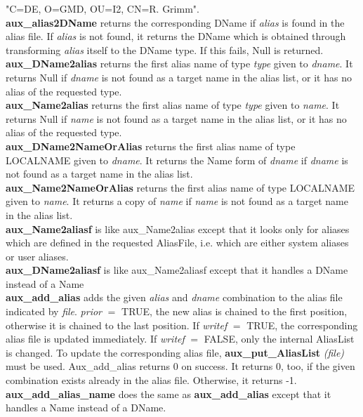 "C=DE, O=GMD, OU=I2, CN=R. Grimm".
\\ [1em]
{\bf aux\_alias2DName} returns the corresponding DName if {\em alias} is found in
the alias file. If {\em alias} is not found, 
it returns the DName which is obtained
through transforming {\em alias} itself to the DName type. If this fails, Null is
returned.
\\ [1em]
{\bf aux\_DName2alias} returns the first alias name of type {\em type} given to {\em dname}.
It returns Null if {\em dname} is not found as a target name in the alias list, 
or it has no
alias of the requested type. 
\\ [1em]
{\bf aux\_Name2alias} returns the first alias name of type {\em type} given to {\em name}.
It returns Null if {\em name} is not found as a target name in the alias list, 
or it has no
alias of the requested type. 
\\ [1em]
{\bf aux\_DName2NameOrAlias} returns the first alias name of type LOCALNAME given to {\em dname}.
It returns the Name form of {\em dname} if {\em dname} is not found as a target name in the alias list.
\\ [1em]
{\bf aux\_Name2NameOrAlias} returns the first alias name of type LOCALNAME given to {\em name}.
It returns a copy of {\em name} if {\em name} is not found as a target name in the alias list. 
\\ [1em]
{\bf aux\_Name2aliasf} is like aux\_Name2alias except that it looks only for aliases
which are defined in the requested AliasFile, i.e. which are either system aliases
or user aliases. 
\\ [1em]
{\bf aux\_DName2aliasf} is like aux\_Name2aliasf except that it handles a DName
instead of a Name
\\ [1em]
{\bf aux\_add\_alias} adds the given {\em alias} and {\em dname} combination to
the alias file indicated by {\em file}. {\em prior} $=$ TRUE, the new alias is
chained to the first position, otherwise it is chained to the last position.
If {\em writef} $=$ TRUE, the corresponding alias file is updated immediately.
If {\em writef} $=$ FALSE, only the internal AliasList is changed. To update
the corresponding alias file, {\bf aux\_put\_AliasList} {\em (file)} must be
used. Aux\_add\_alias returns 0 on success. It returns 0, too, if the
given combination exists already in the alias file. Otherwise, it returns -1.
\\ [1em]
{\bf aux\_add\_alias\_name} does the same as {\bf aux\_add\_alias} except that
it handles a Name instead of a DName.
\\ [1em]
